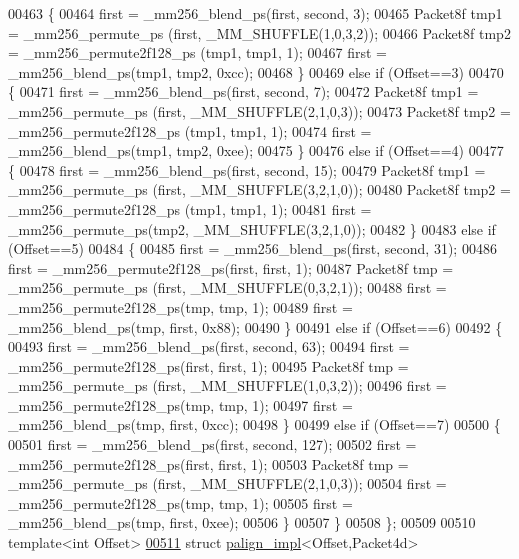 \begin{DoxyCode}
{{00463     \{
00464       first = \_mm256\_blend\_ps(first, second, 3);
00465       Packet8f tmp1 = \_mm256\_permute\_ps (first, \_MM\_SHUFFLE(1,0,3,2));
00466       Packet8f tmp2 = \_mm256\_permute2f128\_ps (tmp1, tmp1, 1);
00467       first = \_mm256\_blend\_ps(tmp1, tmp2, 0xcc);
00468     \}
00469     \textcolor{keywordflow}{else} \textcolor{keywordflow}{if} (Offset==3)
00470     \{
00471       first = \_mm256\_blend\_ps(first, second, 7);
00472       Packet8f tmp1 = \_mm256\_permute\_ps (first, \_MM\_SHUFFLE(2,1,0,3));
00473       Packet8f tmp2 = \_mm256\_permute2f128\_ps (tmp1, tmp1, 1);
00474       first = \_mm256\_blend\_ps(tmp1, tmp2, 0xee);
00475     \}
00476     \textcolor{keywordflow}{else} \textcolor{keywordflow}{if} (Offset==4)
00477     \{
00478       first = \_mm256\_blend\_ps(first, second, 15);
00479       Packet8f tmp1 = \_mm256\_permute\_ps (first, \_MM\_SHUFFLE(3,2,1,0));
00480       Packet8f tmp2 = \_mm256\_permute2f128\_ps (tmp1, tmp1, 1);
00481       first = \_mm256\_permute\_ps(tmp2, \_MM\_SHUFFLE(3,2,1,0));
00482     \}
00483     \textcolor{keywordflow}{else} \textcolor{keywordflow}{if} (Offset==5)
00484     \{
00485       first = \_mm256\_blend\_ps(first, second, 31);
00486       first = \_mm256\_permute2f128\_ps(first, first, 1);
00487       Packet8f tmp = \_mm256\_permute\_ps (first, \_MM\_SHUFFLE(0,3,2,1));
00488       first = \_mm256\_permute2f128\_ps(tmp, tmp, 1);
00489       first = \_mm256\_blend\_ps(tmp, first, 0x88);
00490     \}
00491     \textcolor{keywordflow}{else} \textcolor{keywordflow}{if} (Offset==6)
00492     \{
00493       first = \_mm256\_blend\_ps(first, second, 63);
00494       first = \_mm256\_permute2f128\_ps(first, first, 1);
00495       Packet8f tmp = \_mm256\_permute\_ps (first, \_MM\_SHUFFLE(1,0,3,2));
00496       first = \_mm256\_permute2f128\_ps(tmp, tmp, 1);
00497       first = \_mm256\_blend\_ps(tmp, first, 0xcc);
00498     \}
00499     \textcolor{keywordflow}{else} \textcolor{keywordflow}{if} (Offset==7)
00500     \{
00501       first = \_mm256\_blend\_ps(first, second, 127);
00502       first = \_mm256\_permute2f128\_ps(first, first, 1);
00503       Packet8f tmp = \_mm256\_permute\_ps (first, \_MM\_SHUFFLE(2,1,0,3));
00504       first = \_mm256\_permute2f128\_ps(tmp, tmp, 1);
00505       first = \_mm256\_blend\_ps(tmp, first, 0xee);
00506     \}
00507   \}
00508 \};
00509 
00510 \textcolor{keyword}{template}<\textcolor{keywordtype}{int} Offset>
\hyperlink{struct_eigen_1_1internal_1_1palign__impl_3_01_offset_00_01_packet4d_01_4}{00511} \textcolor{keyword}{struct }\hyperlink{struct_eigen_1_1internal_1_1palign__impl}{palign\_impl}<Offset,Packet4d>
}}
\end{DoxyCode}
